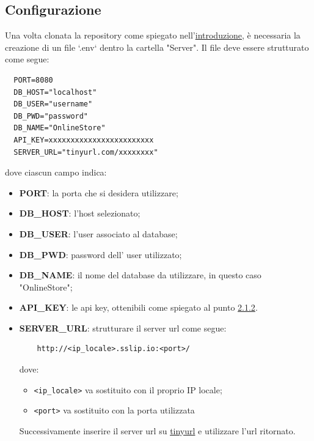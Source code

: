 \documentclass[a4paper, 12pt]{article}
\begin{document}
\subsection{Configurazione}
\label{sec:config_server}
Una volta clonata la repository come spiegato nell'\hyperref[sec:intro]{introduzione}, è necessaria la creazione di un file `.env` dentro la cartella "Server". Il file deve essere strutturato come segue:
\begin{verbatim}
  PORT=8080
  DB_HOST="localhost"
  DB_USER="username"
  DB_PWD="password"
  DB_NAME="OnlineStore"
  API_KEY=xxxxxxxxxxxxxxxxxxxxxxxx
  SERVER_URL="tinyurl.com/xxxxxxxx"
\end{verbatim}
dove ciascun campo indica:
\begin{itemize}
  \item \textbf{PORT}: la porta che si desidera utilizzare;
  \item \textbf{DB\_HOST}: l'host selezionato;
  \item \textbf{DB\_USER}: l'user associato al database;
  \item \textbf{DB\_PWD}: password dell' user utilizzato;
  \item \textbf{DB\_NAME}: il nome del database da utilizzare, in questo caso "OnlineStore";
  \item \textbf{API\_KEY}: le api key, ottenibili come spiegato al punto \hyperref[sec:provider]{2.1.2}.
  \mbox{}
  \item \textbf{SERVER\_URL}: strutturare il server url come segue:
  \begin{verbatim}
    http://<ip_locale>.sslip.io:<port>/
  \end{verbatim}
  dove:
  \begin{itemize}
    \item \verb|<ip_locale>| va sostituito con il proprio IP locale;
    \item \verb|<port>| va sostituito con la porta utilizzata
  \end{itemize}
   Successivamente inserire il server url su \href{https://tinyurl.com/app}{tinyurl} e utilizzare l'url ritornato.
\end{itemize}
\end{document}
